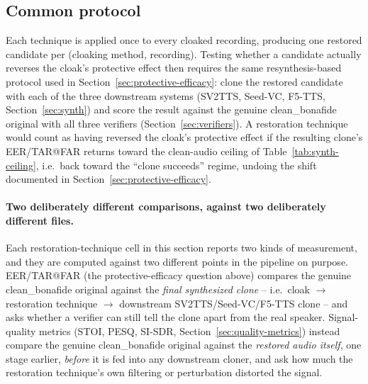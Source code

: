 \documentclass[11pt]{article}
\begin{document}
\subsection{Common protocol}
Each technique is applied once to every cloaked recording, producing
one restored candidate per (cloaking method, recording). Testing
whether a candidate actually reverses the cloak's protective effect
then requires the same resynthesis-based protocol used in
Section~\ref{sec:protective-efficacy}: clone the restored candidate
with each of the three downstream systems (SV2TTS, Seed-VC, F5-TTS,
Section~\ref{sec:synth}) and score the result against the genuine
clean\_bonafide original with all three verifiers
(Section~\ref{sec:verifiers}). A restoration technique would count as
having reversed the cloak's protective effect if the resulting clone's
EER/TAR@FAR returns toward the clean-audio ceiling of
Table~\ref{tab:synth-ceiling}, i.e.\ back toward the ``clone succeeds''
regime, undoing the shift documented in
Section~\ref{sec:protective-efficacy}.

\paragraph{Two deliberately different comparisons, against two
deliberately different files.} Each restoration-technique cell in this
section reports two kinds of measurement, and they are computed against
two different points in the pipeline on purpose. EER/TAR@FAR (the
protective-efficacy question above) compares the genuine
clean\_bonafide original against the \emph{final synthesized clone} --
i.e.\ cloak $\to$ restoration technique $\to$ downstream
SV2TTS/Seed-VC/F5-TTS clone -- and asks whether a verifier can still
tell the clone apart from the real speaker. Signal-quality metrics
(STOI, PESQ, SI-SDR, Section~\ref{sec:quality-metrics}) instead compare
the genuine clean\_bonafide original against the \emph{restored audio
itself}, one stage earlier, \emph{before} it is fed into any downstream
cloner, and ask how much the restoration technique's own filtering or
perturbation distorted the signal.
\end{document}
